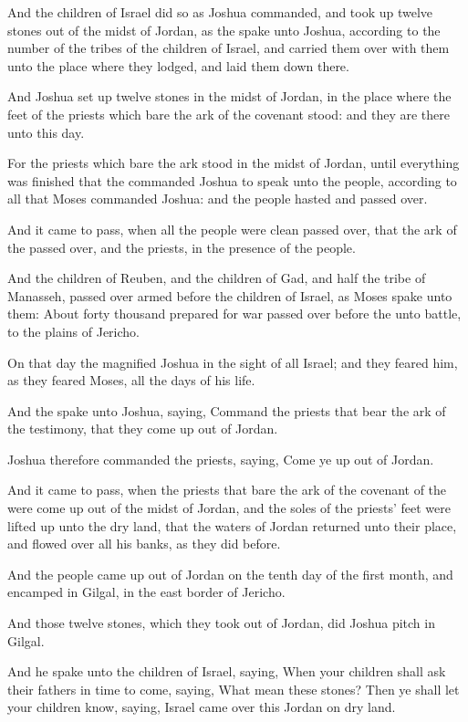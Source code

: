 \Verse And the children of Israel did so as Joshua commanded, and took up twelve stones out of the midst of Jordan, as the \LORD spake unto Joshua, according to the number of the tribes of the children of Israel, and carried them over with them unto the place where they lodged, and laid them down there.

\Verse And Joshua set up twelve stones in the midst of Jordan, in the place where the feet of the priests which bare the ark of the covenant stood: and they are there unto this day.

\Verse For the priests which bare the ark stood in the midst of Jordan, until everything was finished that the \LORD commanded Joshua to speak unto the people, according to all that Moses commanded Joshua: and the people hasted and passed over.

\Verse And it came to pass, when all the people were clean passed over, that the ark of the \LORD passed over, and the priests, in the presence of the people.

\Verse And the children of Reuben, and the children of Gad, and half the tribe of Manasseh, passed over armed before the children of Israel, as Moses spake unto them: \Verse About forty thousand prepared for war passed over before the \LORD unto battle, to the plains of Jericho.

\Verse On that day the \LORD magnified Joshua in the sight of all Israel; and they feared him, as they feared Moses, all the days of his life.

\Verse And the \LORD spake unto Joshua, saying, \Verse Command the priests that bear the ark of the testimony, that they come up out of Jordan.

\Verse Joshua therefore commanded the priests, saying, Come ye up out of Jordan.

\Verse And it came to pass, when the priests that bare the ark of the covenant of the \LORD were come up out of the midst of Jordan, and the soles of the priests' feet were lifted up unto the dry land, that the waters of Jordan returned unto their place, and flowed over all his banks, as they did before.

\Verse And the people came up out of Jordan on the tenth day of the first month, and encamped in Gilgal, in the east border of Jericho.

\Verse And those twelve stones, which they took out of Jordan, did Joshua pitch in Gilgal.

\Verse And he spake unto the children of Israel, saying, When your children shall ask their fathers in time to come, saying, What mean these stones?  \Verse Then ye shall let your children know, saying, Israel came over this Jordan on dry land.

